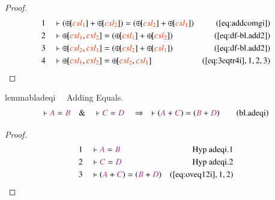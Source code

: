 \begin{proof}
\begin{align}
  1 &&  & \vdash ( {\oplus\hspace{-1pt}[} \msc{csl_1} ] +
      {\oplus\hspace{-1pt}[} \msc{csl_2} ] ) = (
      {\oplus\hspace{-1pt}[} \msc{csl_2} ] +
      {\oplus\hspace{-1pt}[} \msc{csl_1} ]
      )&(\mbox{\ref{eq:addcomgi}})\notag
  \\ 2 &&  & \vdash {\oplus\hspace{-1pt}[} \msc{csl_1} , \msc{csl_2} ] = (
      {\oplus\hspace{-1pt}[} \msc{csl_1} ] +
      {\oplus\hspace{-1pt}[} \msc{csl_2} ]
      )&(\mbox{\ref{eq:df-bl.add2}})\notag
  \\ 3 &&  & \vdash {\oplus\hspace{-1pt}[} \msc{csl_2} , \msc{csl_1} ] = (
      {\oplus\hspace{-1pt}[} \msc{csl_2} ] +
      {\oplus\hspace{-1pt}[} \msc{csl_1} ]
      )&(\mbox{\ref{eq:df-bl.add2}})\notag
  \\ 4 &&  & \vdash {\oplus\hspace{-1pt}[} \msc{csl_1} , \msc{csl_2} ] =
      {\oplus\hspace{-1pt}[} \msc{csl_2} , \msc{csl_1}
      ]&(\mbox{\ref{eq:3eqtr4i}},1,2,3)\notag
\end{align}
\end{proof}

\begin{restatable}{lemma}{bladeqi}~~ Adding Equals.
\begin{align}
\vdash \mc{A} = \mc{B}\quad\&\quad \vdash \mc{C} = \mc{D}\quad\Rightarrow\quad
    \vdash ( \mc{A} + \mc{C} ) = ( \mc{B} + \mc{D}
    )\label{eq:bl.adeqi}\tag{bl.adeqi}
\end{align}
\end{restatable}

\begin{proof}
\begin{align}
  1 &&  & \vdash \mc{A} = \mc{B}&\text{Hyp~adeqi.1}\notag%
  \\ 2 &&  & \vdash \mc{C} = \mc{D}&\text{Hyp~adeqi.2}\notag%
  \\ 3 &&  & \vdash ( \mc{A} + \mc{C} ) = ( \mc{B} + \mc{D}
      )&(\mbox{\ref{eq:oveq12i}},1,2)\notag
\end{align}
\end{proof}


